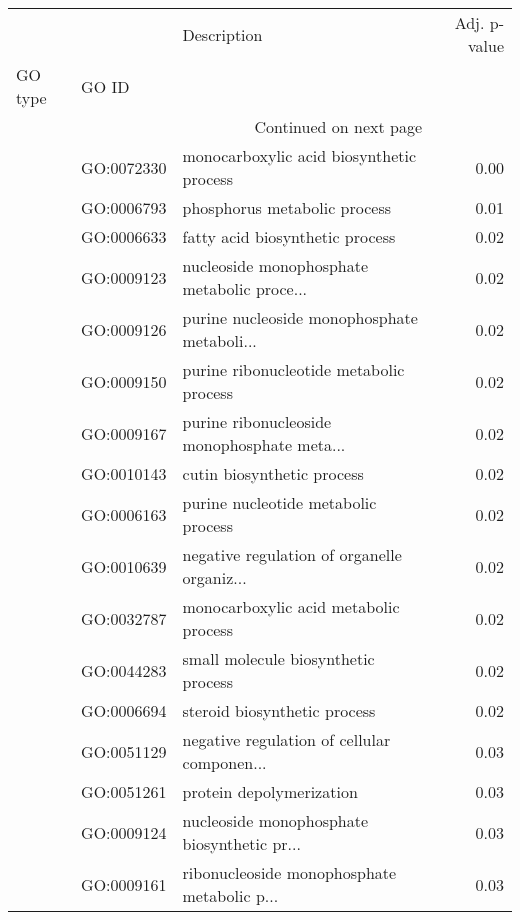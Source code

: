 \begin{longtable}{lllr}
\toprule
   &            &                                  Description &  Adj. p-value \\
GO type & GO ID &                                              &               \\
\midrule
\endhead
\midrule
\multicolumn{3}{r}{{Continued on next page}} \\
\midrule
\endfoot

\bottomrule
\endlastfoot
\multirow{22}{*}{BP} & GO:0072330 &     monocarboxylic acid biosynthetic process &          0.00 \\
   & GO:0006793 &                 phosphorus metabolic process &          0.01 \\
   & GO:0006633 &              fatty acid biosynthetic process &          0.02 \\
   & GO:0009123 &  nucleoside monophosphate metabolic proce... &          0.02 \\
   & GO:0009126 &  purine nucleoside monophosphate metaboli... &          0.02 \\
   & GO:0009150 &      purine ribonucleotide metabolic process &          0.02 \\
   & GO:0009167 &  purine ribonucleoside monophosphate meta... &          0.02 \\
   & GO:0010143 &                   cutin biosynthetic process &          0.02 \\
   & GO:0006163 &          purine nucleotide metabolic process &          0.02 \\
   & GO:0010639 &  negative regulation of organelle organiz... &          0.02 \\
   & GO:0032787 &        monocarboxylic acid metabolic process &          0.02 \\
   & GO:0044283 &          small molecule biosynthetic process &          0.02 \\
   & GO:0006694 &                 steroid biosynthetic process &          0.02 \\
   & GO:0051129 &  negative regulation of cellular componen... &          0.03 \\
   & GO:0051261 &                     protein depolymerization &          0.03 \\
   & GO:0009124 &  nucleoside monophosphate biosynthetic pr... &          0.03 \\
   & GO:0009161 &  ribonucleoside monophosphate metabolic p... &          0.03 \\

\end{longtable}
